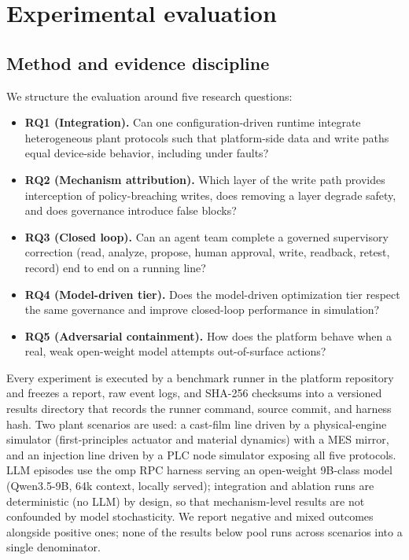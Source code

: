 \section{Experimental evaluation}
\label{sec:eval}

\subsection{Method and evidence discipline}
\label{sec:eval-method}

We structure the evaluation around five research questions:

\begin{itemize}
\item \textbf{RQ1 (Integration).} Can one configuration-driven runtime
integrate heterogeneous plant protocols such that platform-side data and
write paths equal device-side behavior, including under faults?
\item \textbf{RQ2 (Mechanism attribution).} Which layer of the write path
provides interception of policy-breaching writes, does removing a layer
degrade safety, and does governance introduce false blocks?
\item \textbf{RQ3 (Closed loop).} Can an agent team complete a governed
supervisory correction (read, analyze, propose, human approval, write,
readback, retest, record) end to end on a running line?
\item \textbf{RQ4 (Model-driven tier).} Does the model-driven optimization
tier respect the same governance and improve closed-loop performance in
simulation?
\item \textbf{RQ5 (Adversarial containment).} How does the platform behave
when a real, weak open-weight model attempts out-of-surface actions?
\end{itemize}

Every experiment is executed by a benchmark runner in the platform
repository and freezes a report, raw event logs, and SHA-256 checksums
into a versioned results directory that records the runner command, source
commit, and harness hash. Two plant scenarios are used: a cast-film line
driven by a physical-engine simulator (first-principles actuator and
material dynamics) with a MES mirror, and an injection line driven by a
PLC node simulator exposing all five protocols. LLM episodes use the omp
RPC harness serving an open-weight 9B-class model (Qwen3.5-9B, 64k
context, locally served); integration and ablation runs are deterministic
(no LLM) by design, so that mechanism-level results are not confounded by
model stochasticity. We report negative and mixed outcomes alongside
positive ones; none of the results below pool runs across scenarios into
a single denominator.

